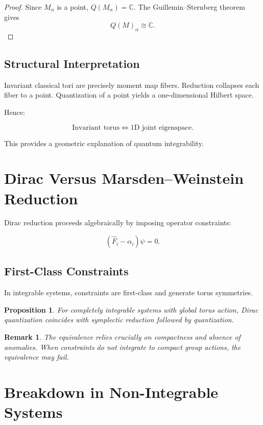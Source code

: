 \documentclass[11pt]{article}
\newtheorem{proposition}[theorem]{Proposition}
\newtheorem{remark}[theorem]{Remark}
\begin{document}
\begin{proof}
Since $M_\alpha$ is a point, $Q(M_\alpha)=\mathbb{C}$. 
The Guillemin--Sternberg theorem gives
\[
Q(M)_\alpha \cong \mathbb{C}.
\]
\end{proof}

\subsection{Structural Interpretation}

Invariant classical tori are precisely moment map fibers.
Reduction collapses each fiber to a point.
Quantization of a point yields a one-dimensional Hilbert space.

Hence:

\[
\boxed{
\text{Invariant torus}
\Longleftrightarrow
\text{1D joint eigenspace}.
}
\]

This provides a geometric explanation of quantum integrability.

\section{Dirac Versus Marsden--Weinstein Reduction}

Dirac reduction proceeds algebraically by imposing operator constraints:

\[
(\hat F_i - \alpha_i)\psi = 0.
\]

\subsection{First-Class Constraints}

In integrable systems, constraints are first-class and generate torus symmetries.

\begin{proposition}
For completely integrable systems with global torus action, Dirac quantization coincides with symplectic reduction followed by quantization.
\end{proposition}

\begin{remark}
The equivalence relies crucially on compactness and absence of anomalies.
When constraints do not integrate to compact group actions, the equivalence may fail.
\end{remark}

\section{Breakdown in Non-Integrable Systems}
\end{document}
